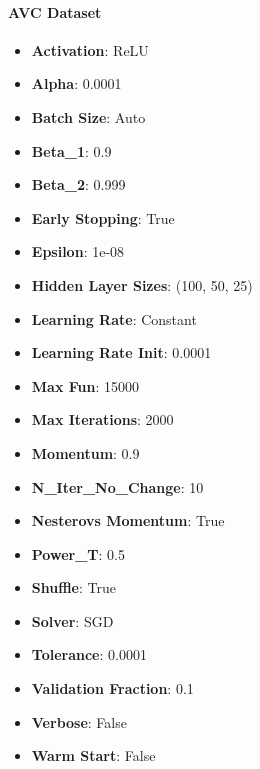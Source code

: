 \documentclass[a4paper,12pt]{article}
\begin{document}
\paragraph{AVC Dataset}
\begin{itemize}
    \item \textbf{Activation}: ReLU
    \item \textbf{Alpha}: 0.0001
    \item \textbf{Batch Size}: Auto
    \item \textbf{Beta\_1}: 0.9
    \item \textbf{Beta\_2}: 0.999
    \item \textbf{Early Stopping}: True
    \item \textbf{Epsilon}: 1e-08
    \item \textbf{Hidden Layer Sizes}: (100, 50, 25)
    \item \textbf{Learning Rate}: Constant
    \item \textbf{Learning Rate Init}: 0.0001
    \item \textbf{Max Fun}: 15000
    \item \textbf{Max Iterations}: 2000
    \item \textbf{Momentum}: 0.9
    \item \textbf{N\_Iter\_No\_Change}: 10
    \item \textbf{Nesterovs Momentum}: True
    \item \textbf{Power\_T}: 0.5
    \item \textbf{Shuffle}: True
    \item \textbf{Solver}: SGD
    \item \textbf{Tolerance}: 0.0001
    \item \textbf{Validation Fraction}: 0.1
    \item \textbf{Verbose}: False
    \item \textbf{Warm Start}: False
\end{itemize}
\end{document}
